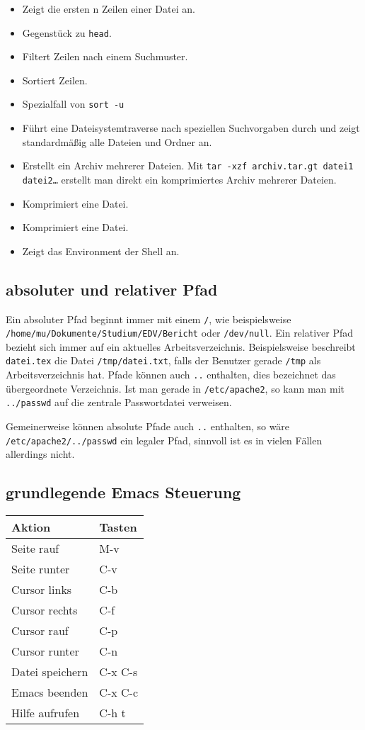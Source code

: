 \documentclass[12pt]{article}
\newcommand\dd[2]{\item[\texttt{#1}] #2}
\begin{document}
\begin{itemize}
\dd{head}{Zeigt die ersten n Zeilen einer Datei an.}
\dd{tail}{Gegenstück zu \texttt{head}.}
\dd{grep}{Filtert Zeilen nach einem Suchmuster.}
\dd{sort}{Sortiert Zeilen.}
\dd{uniq}{Spezialfall von \texttt{sort -u}}
\dd{find}{Führt eine Dateisystemtraverse nach speziellen Suchvorgaben durch und zeigt standardmäßig alle Dateien und Ordner an.}
\dd{tar}{Erstellt ein Archiv mehrerer Dateien. Mit \texttt{tar -xzf archiv.tar.gt datei1 datei2…} erstellt man direkt ein komprimiertes Archiv mehrerer Dateien.}
\dd{gzip}{Komprimiert eine Datei.}
\dd{bzip2}{Komprimiert eine Datei.}
\dd{set}{Zeigt das Environment der Shell an.}
\end{itemize}

\subsection{absoluter und relativer Pfad}

Ein absoluter Pfad beginnt immer mit einem \texttt{/}, wie beispielsweise \\ \texttt{/home/mu/Dokumente/Studium/EDV/Bericht} oder \texttt{/dev/null}. Ein relativer Pfad bezieht sich immer auf ein aktuelles Arbeitsverzeichnis. Beispielsweise beschreibt \texttt{datei.tex} die Datei \texttt{/tmp/datei.txt}, falls der Benutzer gerade \texttt{/tmp} als Arbeitsverzeichnis hat. Pfade können auch \texttt{..} enthalten, dies bezeichnet das übergeordnete Verzeichnis. Ist man gerade in \texttt{/etc/apache2}, so kann man mit \texttt{../passwd} auf die zentrale Passwortdatei verweisen.

Gemeinerweise können absolute Pfade auch \texttt{..} enthalten, so wäre \\
\texttt{/etc/apache2/../passwd} ein legaler Pfad, sinnvoll ist es in vielen Fällen allerdings nicht.

\subsection{grundlegende Emacs Steuerung}

\begin{tabular}{ll}
Aktion & Tasten \\
\hline
Seite rauf & M-v \\
Seite runter & C-v \\
Cursor links & C-b \\
Cursor rechts & C-f \\
Cursor rauf & C-p \\
Cursor runter & C-n \\
Datei speichern & C-x C-s \\
Emacs beenden & C-x C-c \\
Hilfe aufrufen & C-h t \\
\end{tabular}
\end{document}
